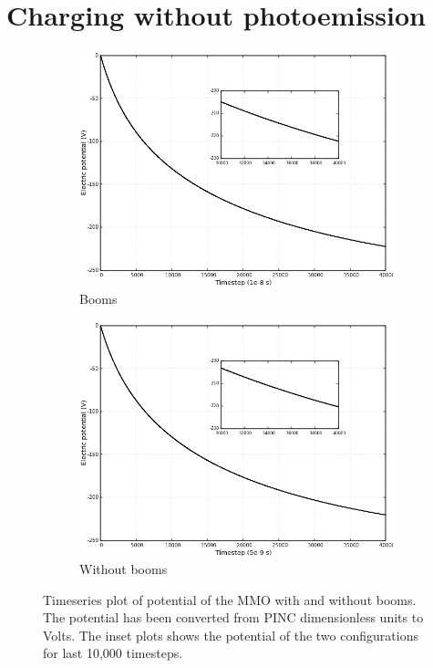 \section{Charging without photoemission}
\begin{center}
    \begin{figure}[H]
      \begin{subfigure}[b]{0.75\textwidth}
      \includegraphics[width=\columnwidth]{figures/MMO/noPH/WB/C_noPH_WB.png}
      \caption{Booms}
      \label{fig:C_noPH_WB}
    \end{subfigure}
    \par\bigskip
    \begin{subfigure}[b]{0.75\textwidth}
      \includegraphics[width=\columnwidth]{figures/MMO/noPH/NB/C_noPH_NB.png}
      \caption{Without booms}
      \label{fig:C_noPH_NB}
    \end{subfigure}
  \caption{Timeseries plot of potential of the MMO with and without booms. The potential has been converted from PINC dimensionless units to Volts. The inset plots shows the potential of the two configurations for last 10,000 timesteps.}
    \label{fig:ConvnoPH}
  \end{figure}
\end{center}

